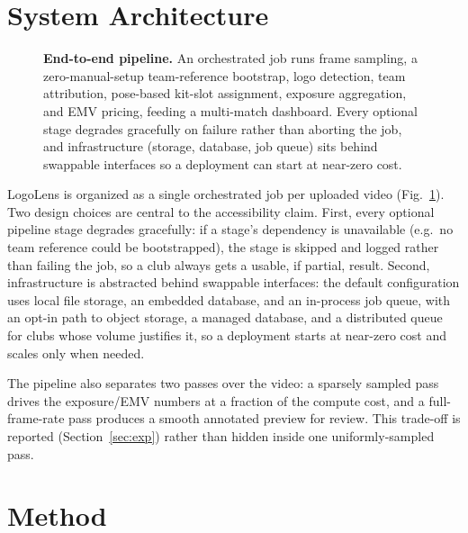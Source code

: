 \documentclass[conference,a4paper]{IEEEtran}
\begin{document}
\section{System Architecture}
\label{sec:arch}

\begin{figure}[t]
\centering

\caption{\textbf{End-to-end pipeline.} An orchestrated job runs frame sampling, a
zero-manual-setup team-reference bootstrap, logo detection, team attribution, pose-based
kit-slot assignment, exposure aggregation, and EMV pricing, feeding a multi-match
dashboard. Every optional stage degrades gracefully on failure rather than aborting the
job, and infrastructure (storage, database, job queue) sits behind swappable interfaces
so a deployment can start at near-zero cost.}
\label{fig:pipeline}
\end{figure}

LogoLens is organized as a single orchestrated job per uploaded video
(Fig.~\ref{fig:pipeline}). Two design choices are central to the accessibility claim.
First, every optional pipeline stage degrades gracefully: if a stage's dependency is
unavailable (e.g.\ no team reference could be bootstrapped), the stage is skipped and
logged rather than failing the job, so a club always gets a usable, if partial, result.
Second, infrastructure is abstracted behind swappable interfaces: the default
configuration uses local file storage, an embedded database, and an in-process job
queue, with an opt-in path to object storage, a managed database, and a distributed
queue for clubs whose volume justifies it, so a deployment starts at near-zero cost and
scales only when needed.

The pipeline also separates two passes over the video: a sparsely sampled pass drives
the exposure/EMV numbers at a fraction of the compute cost, and a full-frame-rate pass
produces a smooth annotated preview for review. This trade-off is reported
(Section~\ref{sec:exp}) rather than hidden inside one uniformly-sampled pass.

\section{Method}
\label{sec:method}
\end{document}
